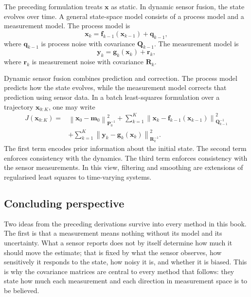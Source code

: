 \documentclass[graybox,envcountchap]{style/SNmono}
\begin{document}
The preceding formulation treats $\mathbf{x}$ as static. In dynamic sensor fusion, the state evolves over time. A general state-space model consists of a process model and a measurement model. The process model is
\begin{equation}
\mathbf{x}_k
=
\mathbf{f}_{k-1}
\left(
\mathbf{x}_{k-1}
\right)
+
\mathbf{q}_{k-1},
\end{equation}
where $\mathbf{q}_{k-1}$ is process noise with covariance $\mathbf{Q}_{k-1}$. The measurement model is
\begin{equation}
\mathbf{y}_k
=
\mathbf{g}_k
\left(
\mathbf{x}_k
\right)
+
\mathbf{r}_k,
\end{equation}
where $\mathbf{r}_k$ is measurement noise with covariance $\mathbf{R}_k$.

Dynamic sensor fusion combines prediction and correction. The process model predicts how the state evolves, while the measurement model corrects that prediction using sensor data. In a batch least-squares formulation over a trajectory $\mathbf{x}_{0:K}$, one may write
\begin{align}
J(\mathbf{x}_{0:K})
=&
\left\|
\mathbf{x}_0
-
\mathbf{m}_0
\right\|_{\mathbf{P}_0^{-1}}^2
+
\sum_{k=1}^{K}
\left\|
\mathbf{x}_k
-
\mathbf{f}_{k-1}
\left(
\mathbf{x}_{k-1}
\right)
\right\|_{\mathbf{Q}_{k-1}^{-1}}^2 \nonumber \\
&+
\sum_{k=1}^{K}
\left\|
\mathbf{y}_k
-
\mathbf{g}_k
\left(
\mathbf{x}_k
\right)
\right\|_{\mathbf{R}_k^{-1}}^2.
\end{align}
The first term encodes prior information about the initial state. The second term enforces consistency with the dynamics. The third term enforces consistency with the sensor measurements. In this view, filtering and smoothing are extensions of regularised least squares to time-varying systems.




\subsection{Concluding perspective}

Two ideas from the preceding derivations survive into every method in this book. The first is that a measurement means nothing without its model and its uncertainty. What a sensor reports does not by itself determine how much it should move the estimate; that is fixed by what the sensor observes, how sensitively it responds to the state, how noisy it is, and whether it is biased. This is why the covariance matrices are central to every method that follows: they state how much each measurement and each direction in measurement space is to be believed.
\end{document}
